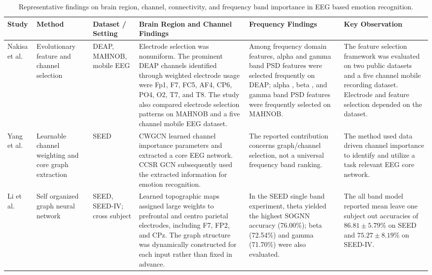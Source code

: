 \documentclass[ASNA,twocolumn]{USG}
\newcommand{\lightrowsep}{%
  \arrayrulecolor{lightrowgray}%
  \specialrule{0.30pt}{3.5pt}{3.5pt}%
  \arrayrulecolor{black}%
}
\begin{document}
\begin{small}
\begin{table}[tp]
\scriptsize
\centering
\setlength{\tabcolsep}{2pt}
\renewcommand{\arraystretch}{1.07}

\caption{Representative findings on brain region, channel, connectivity, and frequency band importance in EEG based emotion recognition.}
\label{tab:brain_channel_band_importance}

\begin{tabularx}{\textwidth}{@{}
>{\raggedright\arraybackslash}p{}
>{\raggedright\arraybackslash}p{}
>{\raggedright\arraybackslash}p{}
>{\raggedright\arraybackslash}X
>{\raggedright\arraybackslash}X
>{\raggedright\arraybackslash}X
@{}}

\toprule
\textbf{Study} &
\textbf{Method} &
\textbf{Dataset / Setting} &
\textbf{Brain Region and Channel Findings} &
\textbf{Frequency Findings} &
\textbf{Key Observation} \\
\midrule

Nakisa et al.~\cite{nakisa2018evolutionary} &
Evolutionary feature and channel selection &
DEAP, MAHNOB, mobile EEG &
Electrode selection was nonuniform. The prominent DEAP channels identified through weighted electrode usage were Fp1, F7, FC5, AF4, CP6, PO4, O2, T7, and T8. The study also compared electrode selection patterns on MAHNOB and a five channel mobile EEG dataset. &
Among frequency domain features, alpha  and gamma band PSD features were selected frequently on DEAP; alpha , beta , and gamma band PSD features were frequently selected on MAHNOB. &
The feature selection framework was evaluated on two public datasets and a five channel mobile recording dataset. Electrode and feature selection depended on the dataset. \\

\lightrowsep

Yang et al.~\cite{yang2024automatically} &
Learnable channel weighting and core graph extraction &
SEED &
CWGCN learned channel importance parameters and extracted a core EEG network. CCSR GCN subsequently used the extracted information for emotion recognition. &
The reported contribution concerns graph/channel selection, not a universal frequency band ranking. &
The method used data driven channel importance to identify and utilize a task relevant EEG core network. \\

\lightrowsep

Li et al.~\cite{li2021cross} &
Self organized graph neural network &
SEED, SEED-IV; cross subject &
Learned topographic maps assigned large weights to prefrontal and centro parietal electrodes, including F7, FP2, and CPz. The graph structure was dynamically constructed for each input rather than fixed in advance. &
In the SEED single band experiment, theta yielded the highest SOGNN accuracy (76.00\%); beta (72.54\%) and gamma (71.70\%) were also evaluated. &
The all band model reported mean leave one subject out accuracies of $86.81\pm5.79$\% on SEED and $75.27\pm8.19$\% on SEED-IV. \\


\end{tabularx}
\end{table}
\end{small}
\end{document}
